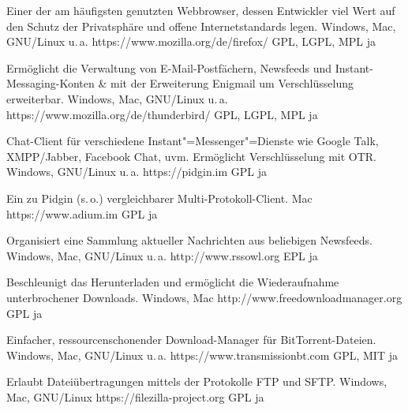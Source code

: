 




{Einer der am häufigsten genutzten Webbrowser, dessen Entwickler viel Wert auf den Schutz der Privatsphäre und offene Internetstandards legen.}
{Windows, Mac, GNU/Linux u.\,a.}
{https://www.mozilla.org/de/firefox/}
{GPL, LGPL, MPL}
{ja}

{Ermöglicht die Verwaltung von E-Mail-Postfächern, Newsfeeds und Instant-Messaging-Konten \& mit der Erweiterung Enigmail um Verschlüsselung erweiterbar.}
{Windows, Mac, GNU/Linux u.\,a.}
{https://www.mozilla.org/de/thunderbird/}
{GPL, LGPL, MPL}
{ja}

{Chat-Client für verschiedene Instant"=Messenger"=Dienste wie \mbox{Google} Talk, XMPP/Jabber, Facebook Chat, uvm. Ermöglicht Verschlüsselung mit OTR.}
{Windows, GNU/Linux u.\,a.}
{https://pidgin.im}
{GPL}
{ja}

{Ein zu Pidgin (s.\,o.) vergleichbarer Multi-Protokoll-Client.}
{Mac}
{https://www.adium.im}
{GPL}
{ja}

{Organisiert eine Sammlung aktueller Nachrichten aus beliebigen Newsfeeds.}
{Windows, Mac, GNU/Linux u.\,a.}
{http://www.rssowl.org}
{EPL}
{ja}

{Beschleunigt das Herunterladen und ermöglicht die Wiederaufnahme unterbrochener Downloads.}
{Windows, Mac}
{http://www.freedownloadmanager.org}
{GPL}
{ja}

{Einfacher, ressourcenschonender Download-Manager für BitTorrent-Dateien.}
{Windows, Mac, GNU/Linux u.\,a.}
{https://www.transmissionbt.com}
{GPL, MIT}
{ja}

{Erlaubt Dateiübertragungen mittels der Protokolle FTP und SFTP.}
{Windows, Mac, GNU/Linux}
{https://filezilla-project.org}
{GPL}
{ja}

\backpage


